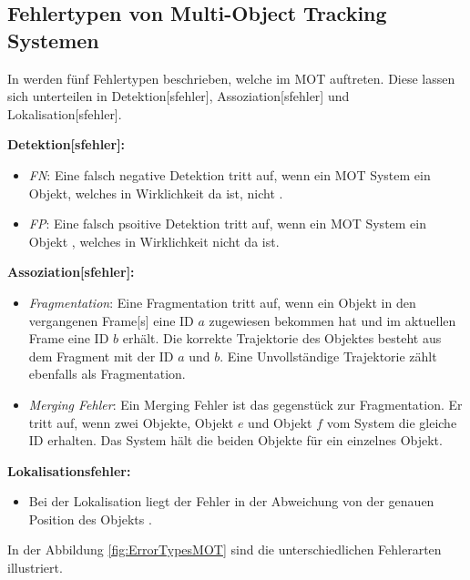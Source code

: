 \subsection{Fehlertypen von Multi-Object Tracking Systemen} \label{sec:MOT Fehlertypen}
In \cite{Leichter.2013} werden fünf Fehlertypen beschrieben, welche im \gls{MOT} auftreten. Diese lassen sich unterteilen in \gls{Detektion}[sfehler], \gls{Assoziation}[sfehler] und \gls{Lokalisation}[sfehler]. \par

\textbf{\gls{Detektion}[sfehler]:}
\begin{itemize}
    \item \textit{\gls{FN}}: Eine falsch negative \gls{Detektion} tritt auf, wenn ein \gls{MOT} System ein Objekt, welches in Wirklichkeit da ist, nicht .
    \item \textit{\gls{FP}}: Eine falsch psoitive \gls{Detektion} tritt auf, wenn ein \gls{MOT} System ein Objekt , welches in Wirklichkeit nicht da ist.
\end{itemize}

\textbf{\gls{Assoziation}[sfehler]:}
\begin{itemize}
    \item \textit{\gls{Fragmentation}}: Eine Fragmentation tritt auf, wenn ein Objekt in den vergangenen \gls{Frame}[s] eine \acrshort{ID} \(a\) zugewiesen bekommen hat und im aktuellen \gls{Frame} eine \acrshort{ID} \(b\) erhält. Die korrekte \gls{Trajektorie} des Objektes besteht aus dem Fragment mit der \acrshort{ID} \(a\) und \(b\). Eine Unvollständige \gls{Trajektorie} zählt ebenfalls als Fragmentation. 
    \item \textit{\gls{Merging Fehler}}: Ein Merging Fehler ist das gegenstück zur Fragmentation. Er tritt auf, wenn zwei Objekte, Objekt \(e\) und Objekt \(f\) vom System die gleiche \acrshort{ID} erhalten. Das System hält die beiden Objekte für ein einzelnes Objekt. 
\end{itemize}

\textbf{\gls{Lokalisationsfehler}:}
\begin{itemize}
    \item Bei der \gls{Lokalisation} liegt der Fehler in der Abweichung von der genauen Position des Objekts \cite{Leichter.2013}. \par
\end{itemize}

In der Abbildung \ref{fig:ErrorTypesMOT} sind die unterschiedlichen Fehlerarten illustriert. 


